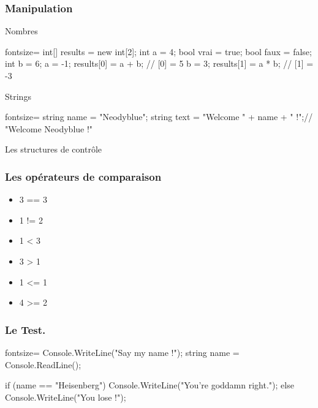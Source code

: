 \begin{frame}[fragile]
  \frametitle{Manipulation}

  \begin{center}{\large Nombres}\end{center}
  \begin{csharpcode*}{fontsize=\scriptsize}
    int[] results = new int[2];
    int a = 4;
    bool vrai = true;
    bool faux = false;
    int b = 6;
    a = -1;
    results[0] = a + b; // [0] = 5
    b = 3;
    results[1] = a * b; // [1] = -3
  \end{csharpcode*}

  \pause

  \begin{center}{\large Strings}\end{center}
  \begin{csharpcode*}{fontsize=\scriptsize}
    string name = "Neodyblue";
    string text = "Welcome " + name + " !";// "Welcome Neodyblue !"
  \end{csharpcode*}
\end{frame}

\begin{frame}
  \begin{center}
    \vspace{1cm}
    {\Large Les structures de contrôle}
  \end{center}
\end{frame}

\begin{frame}[fragile]
  \frametitle{Les opérateurs de comparaison}

  \begin{itemize}
    \item<+-> 3 == 3
    \item<+-> 1 != 2
    \item<+-> 1 < 3
    \item<+-> 3 > 1
    \item<+-> 1 <= 1
    \item<+-> 4 >= 2
  \end{itemize}
\end{frame}

\begin{frame}[fragile]
  \frametitle{Le Test.}

  \begin{csharpcode*}{fontsize=\normalsize}
    Console.WriteLine("Say my name !");
    string name = Console.ReadLine();

    if (name == "Heisenberg")
    {
      Console.WriteLine("You're goddamn right.");
    }
    else
    {
      Console.WriteLine("You lose !");
    }
  \end{csharpcode*}
\end{frame}

